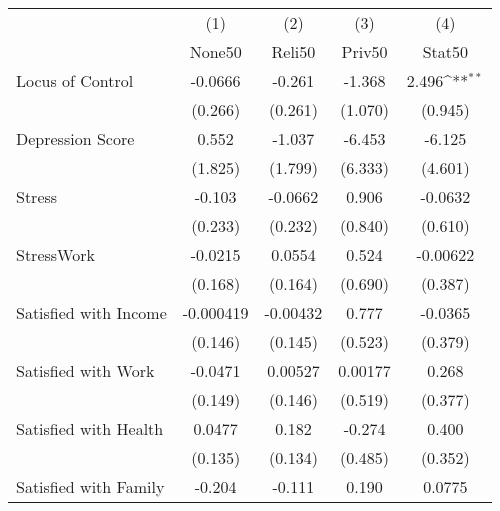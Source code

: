 {
\def\sym#1{\ifmmode^{#1}\else\(^{#1}\)\fi}
\begin{tabular}{l*{4}{c}}
\hline\hline
            &\multicolumn{1}{c}{(1)}&\multicolumn{1}{c}{(2)}&\multicolumn{1}{c}{(3)}&\multicolumn{1}{c}{(4)}\\
            &\multicolumn{1}{c}{None50}&\multicolumn{1}{c}{Reli50}&\multicolumn{1}{c}{Priv50}&\multicolumn{1}{c}{Stat50}\\
\hline
Locus of Control&     -0.0666         &      -0.261         &      -1.368         &       2.496\sym{**} \\
            &     (0.266)         &     (0.261)         &     (1.070)         &     (0.945)         \\
[1em]
Depression Score&       0.552         &      -1.037         &      -6.453         &      -6.125         \\
            &     (1.825)         &     (1.799)         &     (6.333)         &     (4.601)         \\
[1em]
Stress      &      -0.103         &     -0.0662         &       0.906         &     -0.0632         \\
            &     (0.233)         &     (0.232)         &     (0.840)         &     (0.610)         \\
[1em]
StressWork  &     -0.0215         &      0.0554         &       0.524         &    -0.00622         \\
            &     (0.168)         &     (0.164)         &     (0.690)         &     (0.387)         \\
[1em]
Satisfied with Income&   -0.000419         &    -0.00432         &       0.777         &     -0.0365         \\
            &     (0.146)         &     (0.145)         &     (0.523)         &     (0.379)         \\
[1em]
Satisfied with Work&     -0.0471         &     0.00527         &     0.00177         &       0.268         \\
            &     (0.149)         &     (0.146)         &     (0.519)         &     (0.377)         \\
[1em]
Satisfied with Health&      0.0477         &       0.182         &      -0.274         &       0.400         \\
            &     (0.135)         &     (0.134)         &     (0.485)         &     (0.352)         \\
[1em]
Satisfied with Family&      -0.204         &      -0.111         &       0.190         &      0.0775         \\

\end{tabular}}

